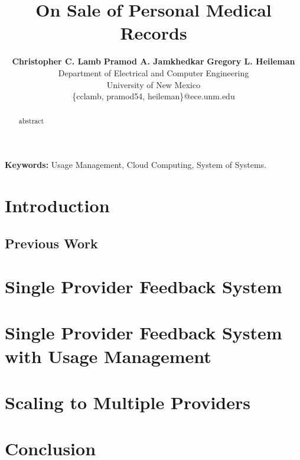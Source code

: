 \documentclass[times, 10pt,twocolumn]{article}
\begin{document}
\title{On Sale of Personal Medical Records}

\author{
        \textbf{Christopher C. Lamb}\hspace*{0.1in}
        \textbf{Pramod A. Jamkhedkar}\hspace*{0.1in}
        \textbf{Gregory L. Heileman}\\
        Department of Electrical and Computer Engineering \\
        University of New Mexico \\
        \small{\{cclamb, pramod54, heileman\}@ece.unm.edu}
}

\maketitle
\thispagestyle{empty}

\begin{abstract}
abstract
\end{abstract}

{
\setlength{\parindent}{0mm}
\textbf{Keywords:} Usage Management, Cloud Computing, System of Systems.
}

\section{Introduction}


\subsection{Previous Work}


\section{Single Provider Feedback System}\label{sec:single}


\section{Single Provider Feedback System with Usage Management}\label{sec:singleUm}


\section{Scaling to Multiple Providers}\label{sec:multiple}


\section{Conclusion}




\end{document}
